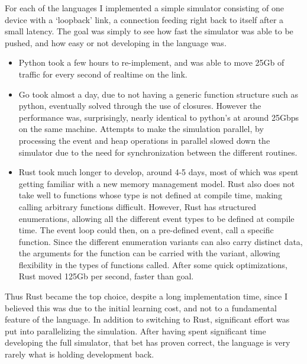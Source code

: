 For each of the languages I implemented a simple simulator consisting of one device with a `loopback' link, a connection feeding right back to itself after a small latency.
The goal was simply to see how fast the simulator was able to be pushed, and how easy or not developing in the language was.
\begin{itemize}
\item Python took a few hours to re-implement, and was able to move 25Gb of traffic for every second of realtime on the link.

\item Go took almost a day, due to not having a generic function structure such as python, eventually solved through the use of closures.
However the performance was, surprisingly, nearly identical to python's at around 25Gbps on the same machine.
Attempts to make the simulation parallel, by processing the event and heap operations in parallel slowed down the simulator due to the need for synchronization between the different routines.

\item Rust took much longer to develop, around 4-5 days, most of which was spent getting familiar with a new memory management model.
Rust also does not take well to functions whose type is not defined at compile time, making calling arbitrary functions difficult.
However, Rust has structured enumerations, allowing all the different event types to be defined at compile time.
The event loop could then, on a pre-defined event, call a specific function.
Since the different enumeration variants can also carry distinct data, the arguments for the function can be carried with the variant, allowing flexibility in the types of functions called.
After some quick optimizations, Rust moved 125Gb per second, faster than goal. 

 
\end{itemize}

Thus Rust became the top choice, despite a long implementation time, since I believed this was due to the initial learning cost, and not to a fundamental feature of the language.
In addition to switching to Rust, significant effort was put into parallelizing the simulation.
After having spent significant time developing the full simulator, that bet has proven correct, the language is very rarely what is holding development back.



